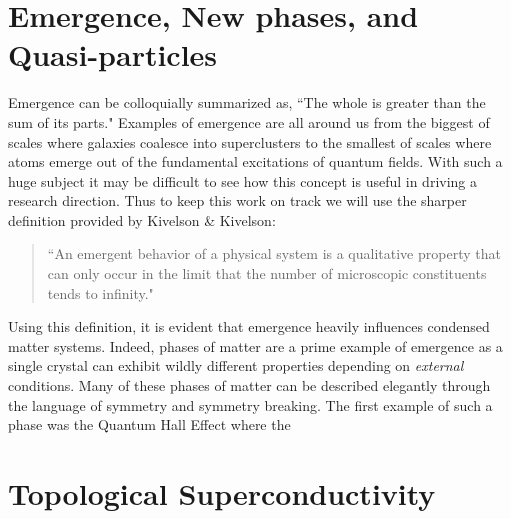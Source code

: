 \section{Emergence, New phases, and Quasi-particles}
Emergence can be colloquially summarized as, ``The whole is greater than the sum of its parts." Examples of emergence are all around us from the biggest of scales where galaxies coalesce into superclusters to the smallest of scales where atoms emerge out of the fundamental excitations of quantum fields. With such a huge subject it may be difficult to see how this concept is useful in driving a research direction. Thus to keep this work on track we will use the sharper definition provided by Kivelson \& Kivelson:
\begin{quote}
	``An emergent behavior of a physical system is a qualitative property that can only occur in the limit that the number of microscopic constituents tends to infinity."\cite{Kivelson2016}
\end{quote}
Using this definition, it is evident that emergence heavily influences condensed matter systems. Indeed, phases of matter are a prime example of emergence as a single crystal can exhibit wildly different properties depending on \textit{external} conditions. Many of these phases of matter can be described elegantly through the language of symmetry and symmetry breaking\cite{Noether1918, Landau1937, pathria_beale_2022}. The first example of such a phase was the Quantum Hall Effect where the 
\section{Topological Superconductivity}
